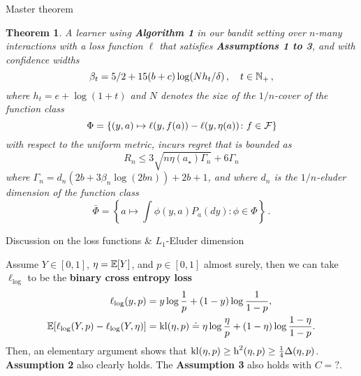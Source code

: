 \documentclass[final,notheorems,noamsthm,20pt]{beamer}
\newtheorem{theorem}{Theorem}
\newlength{\colwidth}
\begin{document}
\begin{frame}[t]
\begin{columns}[t]
\begin{column}{\colwidth}
\begin{alertblock}{Master theorem}
    \begin{theorem}
        A learner using \textbf{Algorithm 1} in our bandit setting over $n$-many interactions with a loss function $\ell$ that satisfies
        \textbf{Assumptions 1 to 3}, and with confidence widths 
        $$
          \beta_t = 5/2 + 15(b+c)\log(N h_t/\delta)\,, \quad t \in \mathbb{N}_+\,,
        $$
        where $h_t = e + \log(1+t)$ and $N$ denotes the size of the $1/n$-cover of the function class
        $$
        \Phi = \{(y,a) \mapsto \ell(y, f(a)) - \ell(y, \eta(a)) \colon f \in \mathcal{F} \}
        $$
        with respect to the uniform metric, incurs regret that is bounded as 
        $$
          R_n \leq 3\sqrt{n\eta(a_\star) \Gamma_n} + 6 \Gamma_n
        $$
        where $\Gamma_n = d_n(2b + 3\beta_n\log(2bn)) + 2b + 1$, and where $d_n$ is the $1/n$-eluder dimension of the function class
        $$
          \bar\Phi = \left\{ a \mapsto \int \phi(y,a) P_a(dy) \colon \phi \in \Phi \right\}\,.
        $$
      \end{theorem}

  \end{alertblock}

  \begin{block}{Discussion on the loss functions \& $L_1$-Eluder dimension}

    \begin{example}
        Assume $Y \in [0,1]$, $\eta = \mathbb{E}[Y]$, and $p\in [0,1]$ almost surely,
        then we can take $\ell_\log$ to be the \textbf{binary cross entropy loss}
        \begin{align*}
            \ell_{\log}(y,p)
            &=  y \log\frac{1}{p} +
            (1 -  y)\log\frac{1}{1-p},\\
            \mathbb{E}[\ell_{\log}(Y,p) - \ell_{\log}(Y,\eta)]
            &=\operatorname{kl}(\eta,p)
            \doteq \eta \log\frac{\eta}{p} + (1-\eta) \log \frac{1-\eta}{1-p}.
        \end{align*}
    Then, an elementary argument shows that
    $\operatorname{kl}(\eta,p)\ge \operatorname{h}^2(\eta,p) \ge \frac14 \Delta(\eta,p)$.
    \textbf{Assumption 2} also clearly holds.
    The \textbf{Assumption 3} also holds with $C=?$.
    \end{example}


\end{block}
\end{column}
\end{columns}
\end{frame}
\end{document}
